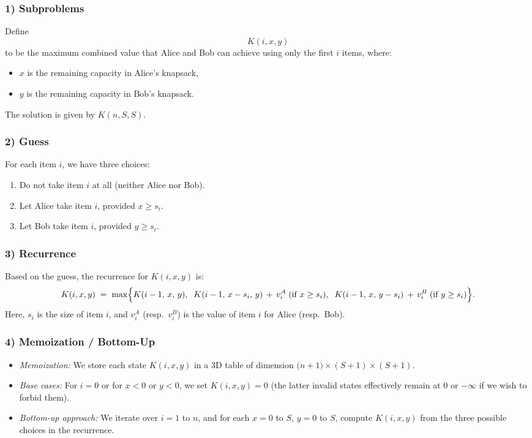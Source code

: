 \documentclass[11pt]{article}
\begin{document}
    \subsubsection*{1) Subproblems}
    
    Define 
    \[
    K(i, x, y)
    \]
    to be the maximum combined value that Alice and Bob can achieve using only the first \(i\) items, where:
    \begin{itemize}
        \item \(x\) is the remaining capacity in Alice's knapsack,
        \item \(y\) is the remaining capacity in Bob's knapsack.
    \end{itemize}
    The solution is given by \( K(n, S, S)\).
    
    \subsubsection*{2) Guess}
    
    For each item \(i\), we have three choices:
    \begin{enumerate}
        \item Do not take item \(i\) at all (neither Alice nor Bob).
        \item Let Alice take item \(i\), provided \(x \ge s_i\).
        \item Let Bob take item \(i\), provided \(y \ge s_i\).
    \end{enumerate}
    
    \subsubsection*{3) Recurrence}
    
    Based on the guess, the recurrence for \(K(i,x,y)\) is:
    \[
    K(i,x,y) \;=\; \max\Bigl\{
        K(i-1,\,x,\,y),\;\;
        K(i-1,\,x - s_i,\,y) \,+\, v_i^A \;\text{(if } x \ge s_i),\;\;
        K(i-1,\,x,\,y - s_i) \,+\, v_i^B \;\text{(if } y \ge s_i)
    \Bigr\}.
    \]
    Here, \(s_i\) is the size of item \(i\), and \(v_i^A\) (resp.\ \(v_i^B\)) is the value of item \(i\) for Alice (resp.\ Bob).
    
    \subsubsection*{4) Memoization / Bottom-Up}
    
    \begin{itemize}
        \item \emph{Memoization:} We store each state \(K(i,x,y)\) in a 3D table of dimension \(\bigl(n+1\bigr) \times (S+1) \times (S+1)\). 
        \item \emph{Base cases:} For \(i=0\) or for \(x<0\) or \(y<0\), we set \(K(i,x,y)=0\) (the latter invalid states effectively remain at 0 or \(-\infty\) if we wish to forbid them).
        \item \emph{Bottom-up approach:} We iterate over \(i=1\) to \(n\), and for each \(x=0\) to \(S\), \(y=0\) to \(S\), compute \(K(i,x,y)\) from the three possible choices in the recurrence.
    \end{itemize}
    
\end{document}

